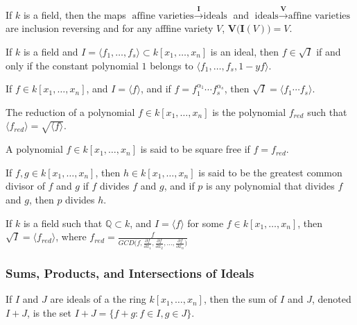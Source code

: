 \documentclass[../main.tex]{subfiles}
\begin{document}
\begin{theorem}
If $k$ is a field, then the maps $\textrm{affine varieties} \overset{\textbf{I}}\rightarrow \textrm{ideals}$ and $\textrm{ideals} \overset{\textbf{V}}\rightarrow \textrm{affine varieties}$ are inclusion reversing and for any afffine variety $V$, $\textbf{V}\big(\textbf{I}(V)\big) = V$.
\end{theorem}

\begin{theorem}
If $k$ is a field and $I=\langle f_1,\hdots, f_s\rangle\subset k[x_1,\hdots ,x_n]$ is an ideal, then $f\in \sqrt{I}$ if and only if the constant polynomial $1$ belongs to $\langle f_1,\hdots, f_s, 1-yf\rangle$.
\end{theorem}

\begin{theorem}
If $f\in k[x_1,\hdots ,x_n]$, and $I = \langle f\rangle$, and if $f = f_1^{\alpha_1}\cdots f_s^{\alpha_s}$, then $\sqrt{I} = \langle f_1\cdots f_s\rangle$.
\end{theorem}

\begin{definition}
The reduction of a polynomial $f\in k[x_1,\hdots ,x_n]$ is the polynomial $f_{red}$ such that $\langle f_{red}\rangle = \sqrt{\langle f\rangle}$.
\end{definition}

\begin{definition}
A polynomial $f\in k[x_1,\hdots ,x_n]$ is said to be square free if $f = f_{red}$.
\end{definition}

\begin{definition}
If $f,g\in k[x_1,\hdots ,x_n]$, then $h\in k[x_1,\hdots ,x_n]$ is said to be the greatest common divisor of $f$ and $g$ if $f$ divides $f$ and $g$, and if $p$ is any polynomial that divides $f$ and $g$, then $p$ divides $h$.
\end{definition}

\begin{theorem}
If $k$ is a field such that $\mathbb{Q} \subset k$, and $I = \langle f\rangle$ for some $f\in k[x_1,\hdots ,x_n]$, then $\sqrt{I} = \langle f_{red}\rangle$, where $f_{red} = \frac{f}{GCD\big(f, \frac{\partial f}{\partial x_1}, \frac{\partial f}{\partial x_2}, \hdots, \frac{\partial f}{\partial x_n}\big)}$
\end{theorem}
%
\subsubsection{Sums, Products, and Intersections of Ideals}
%
\begin{definition}
If $I$ and $J$ are ideals of a the ring $k[x_1,\hdots ,x_n]$, then the sum of $I$ and $J$, denoted $I+J$, is the set $I+J = \{f+g: f\in I, g\in J\}$.
\end{definition}
\end{document}

